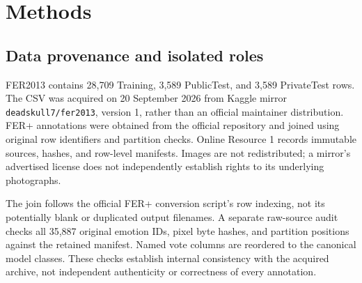 \documentclass[pdflatex,sn-mathphys-num]{sn-jnl}
\begin{document}
\section{Methods}
\subsection{Data provenance and isolated roles}
FER2013 contains 28,709 Training, 3,589 PublicTest, and 3,589 PrivateTest rows. The CSV was acquired on 20 September 2026 from Kaggle mirror \texttt{deadskull7/fer2013}, version 1, rather than an official maintainer distribution. FER+ annotations were obtained from the official repository and joined using original row identifiers and partition checks. Online Resource 1 records immutable sources, hashes, and row-level manifests. Images are not redistributed; a mirror's advertised license does not independently establish rights to its underlying photographs.

The join follows the official FER+ conversion script's row indexing, not its potentially blank or duplicated output filenames. A separate raw-source audit checks all 35,887 original emotion IDs, pixel byte hashes, and partition positions against the retained manifest. Named vote columns are reordered to the canonical model classes. These checks establish internal consistency with the acquired archive, not independent authenticity or correctness of every annotation.
\end{document}
